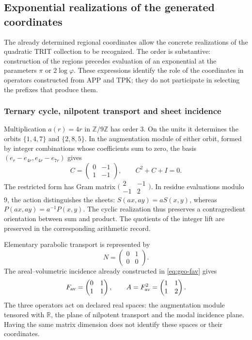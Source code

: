 \subsection{Exponential realizations of the generated coordinates}
\label{geo-euler-trit-articulacion}

The already determined regional coordinates allow the concrete
realizations of the quadratic TRIT collection to be recognized. The order is
substantive: construction of the regions precedes evaluation of an
exponential at the parameters \(\pi\) or \(2\log\varphi\). These expressions
identify the role of the coordinates in operators constructed from
APP and TPK; they do not participate in selecting the prefixes that produce them.

\subsubsection{Ternary cycle, nilpotent transport and sheet incidence}

Multiplication \(a(r)=4r\) in \(\mathbb Z/9\mathbb Z\) has order
\(3\). On the units it determines the orbits \(\{1,4,7\}\) and
\(\{2,8,5\}\). In the augmentation module of either orbit, formed by
integer combinations whose coefficients sum to zero, the basis
\((e_r-e_{4r},e_{4r}-e_{7r})\) gives
\[
 C=\begin{pmatrix}0&-1\\1&-1\end{pmatrix},
 \qquad C^2+C+I=0.
\]
The restricted form has Gram matrix
\(\bigl(\begin{smallmatrix}2&-1\\-1&2\end{smallmatrix}\bigr)\).
In residue evaluations modulo \(9\), the action distinguishes the sheets:
\(S(ax,ay)=aS(x,y)\), whereas \(P(ax,ay)=a^{-1}P(x,y)\).
The cyclic realization thus preserves a contragredient orientation
between sum and product. The quotients of the integer lift are preserved
in the corresponding arithmetic record.

Elementary parabolic transport is represented by
\[
 N=\begin{pmatrix}0&1\\0&0\end{pmatrix}.
\]
The areal--volumetric incidence already constructed in \eqref{eq:geo-fav} gives
\[
 F_{\rm av}=\begin{pmatrix}0&1\\1&1\end{pmatrix},
 \qquad A=F_{\rm av}^2=\begin{pmatrix}1&1\\1&2\end{pmatrix}.
\]
The three operators act on declared real spaces: the augmentation
module tensored with \(\mathbb R\), the plane of nilpotent transport and
the modal incidence plane. Having the same matrix dimension does not identify
these spaces or their coordinates.

